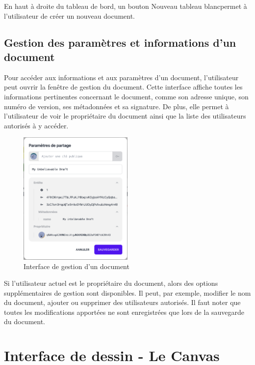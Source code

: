En haut à droite du tableau de bord, un bouton \guillemotleft Nouveau tableau blanc\guillemotright permet à l'utilisateur de créer un nouveau document.

\subsection{Gestion des paramètres et informations d'un document}

Pour accéder aux informations et aux paramètres d'un document, l'utilisateur peut ouvrir la fenêtre de gestion du document. Cette interface affiche toutes les informations pertinentes concernant le document, comme son adresse unique, son numéro de version, ses métadonnées et sa signature. De plus, elle permet à l'utilisateur de voir le propriétaire du document ainsi que la liste des utilisateurs autorisés à y accéder.

\begin{figure}[H]
    \centering
    \includegraphics[width=0.5\textwidth]{assets/figures/describble-share-modal.png}
    \caption{Interface de gestion d'un document}
    \label{fig:doc_management}
\end{figure}

Si l'utilisateur actuel est le propriétaire du document, alors des options supplémentaires de gestion sont disponibles. Il peut, par exemple, modifier le nom du document, ajouter ou supprimer des utilisateurs autorisés. Il faut noter que toutes les modifications apportées ne sont enregistrées que lors de la sauvegarde du document.

\section{Interface de dessin - Le Canvas}

